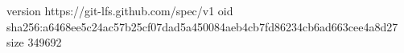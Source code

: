 version https://git-lfs.github.com/spec/v1
oid sha256:a6468ee5c24ac57b25cf07dad5a450084aeb4cb7fd86234cb6ad663cee4a8d27
size 349692
